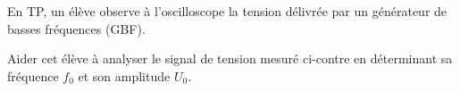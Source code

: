  
 \finEntrainement













 \hauteurLargeurCadreReponse		{6mm}{2.75cm}
 \typeEntrainement					{} %
 \initialisationEntrainement

 \initialisationPartieGauche %
 En TP, un élève observe à l'oscilloscope la tension délivrée par un générateur de basses fréquences (GBF).

 Aider cet élève à analyser le signal de tension mesuré ci-contre en déterminant sa fréquence $f_0$ et son amplitude $U_0$.
 
